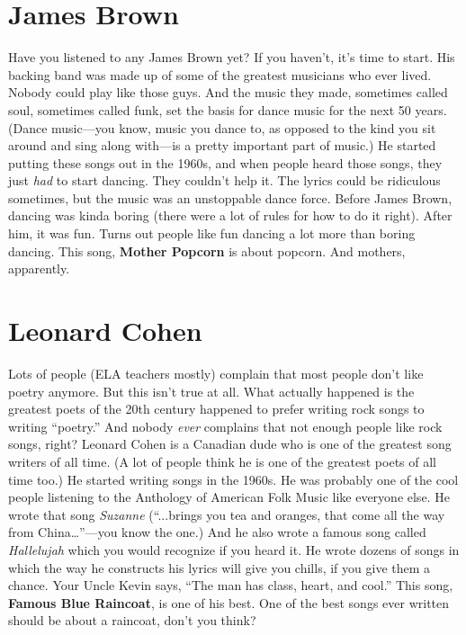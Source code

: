 \documentclass[letterpaper,single]{article}
\begin{document}
\section{James Brown}
Have you listened to any James Brown yet? If you haven't, it's time to
start. His backing band was made up of some of the greatest musicians
who ever lived. Nobody could play like those guys. And the music they
made, sometimes called soul, sometimes called funk, set the basis for
dance music for the next 50 years. (Dance music---you know, music you
dance to, as opposed to the kind you sit around and sing along with---is
a pretty important part of music.) He started putting these songs out
in the 1960s, and when people heard those songs, they just \emph{had}
to start dancing. They couldn't help it. The lyrics could be ridiculous
sometimes, but the music was an unstoppable dance force. Before James
Brown, dancing was kinda boring (there were a lot of rules for how to
do it right). After him, it was fun. Turns out people like fun dancing
a lot more than boring dancing. This song, \textbf{Mother Popcorn} is
about popcorn. And mothers, apparently.

\section{Leonard Cohen}
Lots of people (ELA teachers mostly) complain that most people don't
like poetry anymore. But this isn't true at all. What actually happened
is the greatest poets of the 20th century happened to prefer writing
rock songs to writing ``poetry.'' And nobody \emph{ever} complains that
not enough people like rock songs, right? Leonard Cohen is a Canadian
dude who is one of the greatest song writers of all time. (A lot of
people think he is one of the greatest poets of all time too.) He
started writing songs in the 1960s. He was probably one of the cool
people listening to the Anthology of American Folk Music like everyone
else. He wrote that song \emph{Suzanne} (``...brings you tea and
oranges, that come all the way from China\ldots''---you know the one.) And
he also wrote a famous song called \emph{Hallelujah} which you would
recognize if you heard it. He wrote dozens of songs in which the way he
constructs his lyrics will give you chills, if you give them a chance.
Your Uncle Kevin says, ``The man has class, heart, and cool.'' This
song, \textbf{Famous Blue Raincoat}, is one of his best. One of the
best songs ever written should be about a raincoat, don't you think? 
\end{document}
